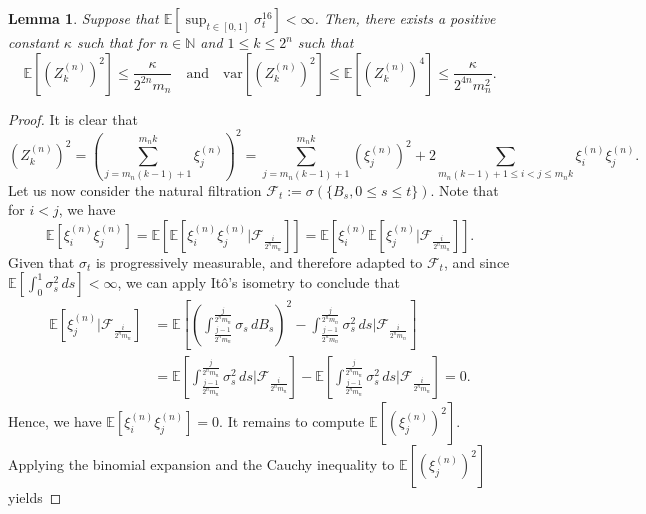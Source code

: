 \documentclass[12pt,reqno]{article}
\numberwithin{equation}{section}
\def\var{\mbox{var}}
\def\cF{{\mathscr F}}
\newtheorem{lemma}[theorem]{Lemma}
\theoremstyle{definition}
\newcommand{\bE}{\mathbb{E}}
\newcommand{\bN}{\mathbb{N}}
\begin{document}
\begin{lemma}\label{lemma bound RV}
	Suppose that $\bE\left[\sup_{t \in [0,1]} \sigma^{16}_t\right] < \infty$. Then, there exists a positive constant $\kappa$ such that for $n \in \bN$ and $1 \le k \le 2^n$ such that   
	\begin{equation}\label{eq bound RV}
		\bE\left[\left(Z^{(n)}_{k}\right)^2\right] \le \frac{\kappa}{2^{2n}m_n} \quad \text{and} \quad  \var\left[\left(Z^{(n)}_k\right)^2\right] \le \bE\left[\left(Z^{(n)}_{k}\right)^4\right] \le \frac{\kappa}{2^{4n}m_n^2}.
	\end{equation}
\end{lemma}
\begin{proof}
	It is clear that 
	\begin{equation*}
		\left(Z^{(n)}_{k}\right)^2 =\left(\sum_{j = m_n(k-1)+1}^{m_n k} \xi^{(n)}_j\right)^2 = \sum_{j = m_n(k-1)+1}^{m_n k}\left(\xi^{(n)}_j\right)^2 + 2\sum_{m_n(k-1)+1 \le i < j \le m_n k}\xi^{(n)}_{i}\xi^{(n)}_{j}.
	\end{equation*}
	Let us now consider the natural filtration $\cF_t := \sigma(\{B_s, 0 \le s \le t\})$. Note that for $i < j$, we have 
	\begin{equation*}
		\bE\left[\xi^{(n)}_{i}\xi^{(n)}_{j}\right] = \bE\left[\bE\left[\xi^{(n)}_{i}\xi^{(n)}_{j}\Big|\cF_{\frac{i}{2^n m_n}} \right]\right] = \bE\left[\xi^{(n)}_{i}\bE\left[\xi^{(n)}_{j}\Big|\cF_{\frac{i}{2^n m_n}}\right]\right].
	\end{equation*}
	Given that  $\sigma_t$ is progressively measurable, and therefore adapted to $\cF_t$, and since $\bE\left[\int_0^1 \sigma_s^{2}\,ds\right] < \infty$, we can apply It\^{o}'s isometry to conclude that 
	\begin{equation}\label{eq martingale diff}
		\begin{split}
			\bE\left[\xi^{(n)}_{j}\Big|\cF_{\frac{i}{2^n m_n}}\right] &= \bE\left[\left(\int^{\frac{j}{2^n m_n}}_{\frac{j-1}{2^n m_n}}\sigma_s \,dB_s\right)^2 - \int^{\frac{j}{2^n m_n}}_{\frac{j-1}{2^n m_n}}\sigma^2_s\,ds\bigg|\cF_{\frac{i}{2^n m_n}}\right]\\&= \bE\left[\int^{\frac{j}{2^n m_n}}_{\frac{j-1}{2^n m_n}}\sigma^2_s\,ds\bigg|\cF_{\frac{i}{2^n m_n}}\right]
			-\bE\left[\int^{\frac{j}{2^n m_n}}_{\frac{j-1}{2^n m_n}}\sigma^2_s\,ds\bigg|\cF_{\frac{i}{2^n m_n}}\right] = 0.
		\end{split}
	\end{equation}
	Hence, we have $\bE\left[\xi^{(n)}_{i}\xi^{(n)}_{j}\right] = 0$. It remains to compute $\bE\left[(\xi^{(n)}_j)^2\right]$. Applying the binomial expansion and the Cauchy inequality to $\bE\left[(\xi^{(n)}_j)^2\right]$ yields 

\end{proof}
\end{document}
